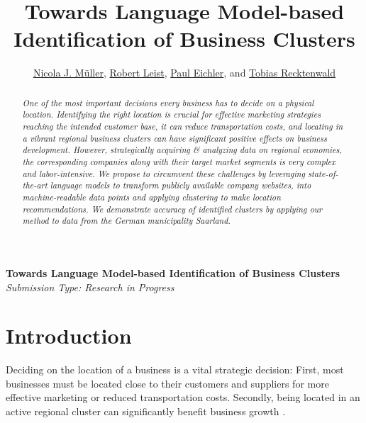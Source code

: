 \documentclass[12pt]{article}
\author{\small \href{mailto:s8namuel@stud.uni-saarland.de}{Nicola J. Müller}, \href{s8roleis@stud.uni-saarland.de}{Robert Leist}, \href{mailto:s8pleich@uni-saarland.de}{Paul Eichler}, and \href{mailto:s8tsreck@stud.uni-saarland.de}{Tobias Recktenwald}}
\title{\vspace{-3cm}Towards Language Model-based Identification of Business Clusters}
\date{}
\begin{document}
	\pagestyle{fancy}

	\fancyfoot{} %
	\fancyfoot[r]{\thepage}

	\renewcommand{\headrulewidth}{0pt}
	\fancyhead{} %

    \begin{center}
		{\fontsize{20}{20} \textbf{Towards Language Model-based Identification of Business Clusters}}\\
		\vspace*{0.2cm}
		\textit{Submission Type: Research in Progress}
	\end{center}

   \begin{abstract}
	
	\textit{\small
	One of the most important decisions every business has to decide on a physical location. Identifying the right location is crucial for effective marketing strategies reaching the intended customer base, it can reduce transportation costs, and locating in a vibrant regional business clusters can have significant positive effects on business development.
	However, strategically acquiring \& analyzing data on regional economies, the corresponding companies along with their target market segments is very complex and labor-intensive.}
	\textit{\small
	We propose to circumvent these challenges by leveraging state-of-the-art language models to transform publicly available company websites, into machine-readable data points and  applying clustering to make location recommendations. We demonstrate accuracy of identified clusters by applying our method to data from the German municipality Saarland.
	}
   \end{abstract}
   
   
   \section*{Introduction}
   Deciding on the location of a business is a vital strategic decision: First, most businesses must be located close to their customers and suppliers for more effective marketing or reduced transportation costs. Secondly, being located in an active regional cluster can significantly benefit business growth \cite{clustersandcomp,gems-model, regionaladv, clustertheory}. 
   
\end{document}
